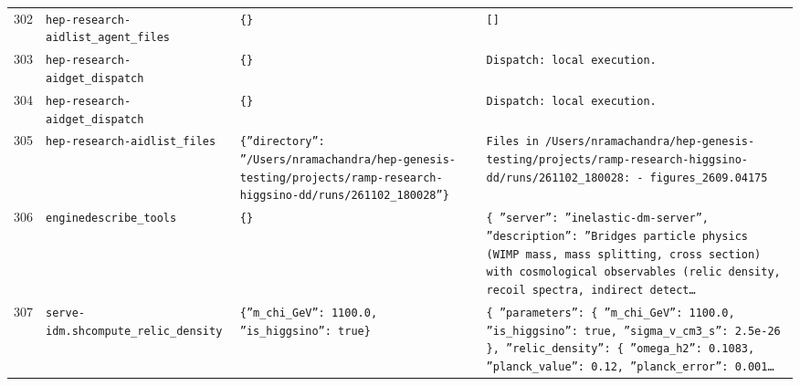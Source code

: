 \documentclass[11pt,a4paper]{article}
\begin{document}
\begin{longtable}{@{}p{}p{}p{}p{}@{}}
302 & \texttt{hep-research-aid}\newline\texttt{list\_\allowbreak{}agent\_\allowbreak{}files} & \texttt{\{\}\allowbreak{}} & \texttt{[]\allowbreak{}} \\
303 & \texttt{hep-research-aid}\newline\texttt{get\_\allowbreak{}dispatch} & \texttt{\{\}\allowbreak{}} & \texttt{Dispatch:\allowbreak{} local execution.} \\
304 & \texttt{hep-research-aid}\newline\texttt{get\_\allowbreak{}dispatch} & \texttt{\{\}\allowbreak{}} & \texttt{Dispatch:\allowbreak{} local execution.} \\
305 & \texttt{hep-research-aid}\newline\texttt{list\_\allowbreak{}files} & \texttt{\{''directory'':\allowbreak{} ''/\allowbreak{}Users/\allowbreak{}nramachandra/\allowbreak{}hep-genesis-testing/\allowbreak{}projects/\allowbreak{}ramp-research-higgsino-dd/\allowbreak{}runs/\allowbreak{}261102\_\allowbreak{}180028''\}\allowbreak{}} & \texttt{Files in /\allowbreak{}Users/\allowbreak{}nramachandra/\allowbreak{}hep-genesis-testing/\allowbreak{}projects/\allowbreak{}ramp-research-higgsino-dd/\allowbreak{}runs/\allowbreak{}261102\_\allowbreak{}180028:\allowbreak{}   - figures\_\allowbreak{}2609.04175} \\
306 & \texttt{engine}\newline\texttt{describe\_\allowbreak{}tools} & \texttt{\{\}\allowbreak{}} & \texttt{\{   ''server'':\allowbreak{} ''inelastic-dm-server'',\allowbreak{}   ''description'':\allowbreak{} ''Bridges particle physics (WIMP mass,\allowbreak{} mass splitting,\allowbreak{} cross section)\allowbreak{} with cosmological observables (relic density,\allowbreak{} recoil spectra,\allowbreak{} indirect detect\ldots{}\allowbreak{}} \\
307 & \texttt{serve-idm.sh}\newline\texttt{compute\_\allowbreak{}relic\_\allowbreak{}density} & \texttt{\{''m\_\allowbreak{}chi\_\allowbreak{}GeV'':\allowbreak{} 1100.0,\allowbreak{} ''is\_\allowbreak{}higgsino'':\allowbreak{} true\}\allowbreak{}} & \texttt{\{   ''parameters'':\allowbreak{} \{     ''m\_\allowbreak{}chi\_\allowbreak{}GeV'':\allowbreak{} 1100.0,\allowbreak{}     ''is\_\allowbreak{}higgsino'':\allowbreak{} true,\allowbreak{}     ''sigma\_\allowbreak{}v\_\allowbreak{}cm3\_\allowbreak{}s'':\allowbreak{} 2.5e-26   \}\allowbreak{},\allowbreak{}   ''relic\_\allowbreak{}density'':\allowbreak{} \{     ''omega\_\allowbreak{}h2'':\allowbreak{} 0.1083,\allowbreak{}     ''planck\_\allowbreak{}value'':\allowbreak{} 0.12,\allowbreak{}     ''planck\_\allowbreak{}error'':\allowbreak{} 0.001\ldots{}\allowbreak{}} \\

\end{longtable}
\end{document}
